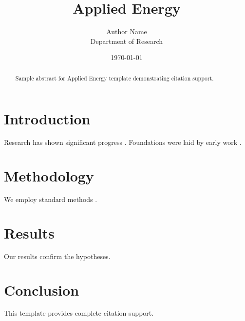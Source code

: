 ﻿\documentclass{elsarticle}
\title{Applied Energy}
\author{Author Name \\ \small Department of Research}
\date{\today}
\begin{document}
\maketitle

\begin{abstract}
Sample abstract for Applied Energy template demonstrating citation support.
\end{abstract}

\section{Introduction}
Research has shown significant progress \citep{einstein1905}. Foundations were laid by early work \citep{turing1950}.

\section{Methodology}
We employ standard methods \citep{knuth1984}.

\section{Results}
Our results confirm the hypotheses.

\section{Conclusion}
This template provides complete citation support.



\end{document}

